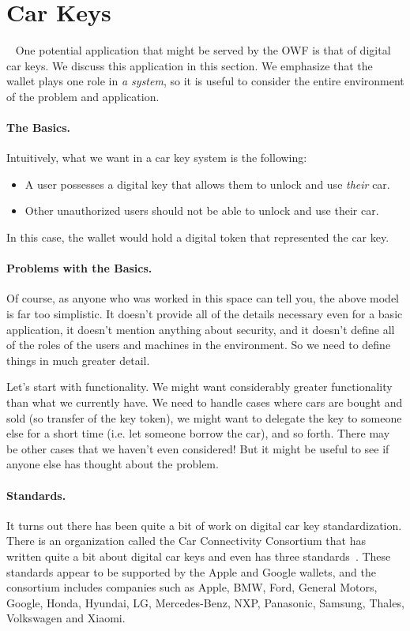 
\section{Car Keys}~\label{sec:carkeys}
One potential application that might be served by the OWF is that of digital car keys.  We discuss this application in this section.  We emphasize that the wallet plays one role in \emph{a system}, so it is useful to consider the entire environment of the problem and application.

\paragraph{The Basics.}  Intuitively, what we want in a car key system is the following:
\begin{itemize}
\item A user possesses a digital key that allows them to unlock and use \emph{their} car.
\item Other unauthorized users should not be able to unlock and use their car.
\end{itemize}
In this case, the wallet would hold a digital token that represented the car key.

\paragraph{Problems with the Basics.}  Of course, as anyone who was worked in this space can tell you, the above model is far too simplistic.  It doesn't provide all of the details necessary even for a basic application, it doesn't mention anything about security, and it doesn't define all of the roles of the users and machines in the environment.  So we need to define things in much greater detail.

Let's start with functionality.  We might want considerably greater functionality than what we currently have.  We need to handle cases where cars are bought and sold (so transfer of the key token), we might want to delegate the key to someone else for a short time (i.e. let someone borrow the car), and so forth.  There may be other cases that we haven't even considered!  But it might be useful to see if anyone else has thought about the problem.

\paragraph{Standards.}  It turns out there has been quite a bit of work on digital car key standardization.  There is an organization called the Car Connectivity Consortium that has written quite a bit about digital car keys and even has three standards~\cite{CarKeyWhitepaper}.  These standards appear to be supported by the Apple and Google wallets, and the consortium includes companies such as Apple, BMW, Ford, General Motors, Google, Honda, Hyundai, LG, Mercedes-Benz, NXP, Panasonic, Samsung, Thales, Volkswagen and Xiaomi.  

